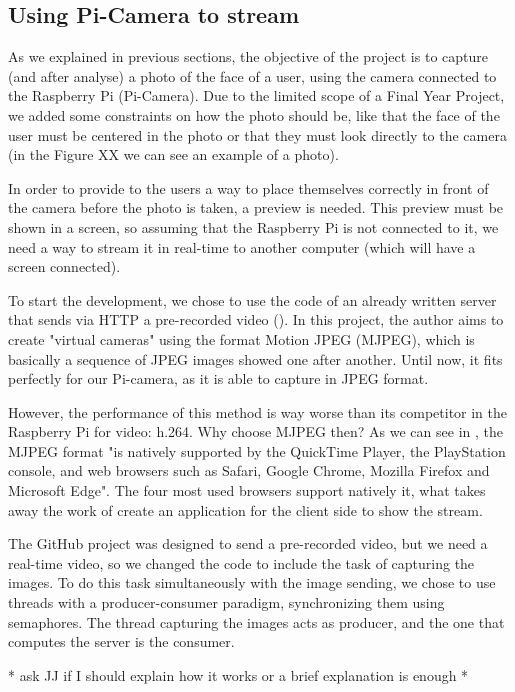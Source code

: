 	\subsection{Using Pi-Camera to stream}
	As we explained in previous sections, the objective of the project is to capture (and after analyse) a photo of the face of a user, using the camera connected to the Raspberry Pi (Pi-Camera). Due to the limited scope of a Final Year Project, we added some constraints on how the photo should be, like that the face of the user must be centered in the photo or that they must look directly to the camera (in the Figure XX we can see an example of a photo). 

	In order to provide to the users a way to place themselves correctly in front of the camera before the photo is taken, a preview is needed.	This preview must be shown in a screen, so assuming that the Raspberry Pi is not connected to it, we need a way to stream it in real-time to another computer (which will have a screen connected).

	To start the development, we chose to use the code of an already written server that sends via HTTP a pre-recorded video (\cite{mjpeg_server_base_code}). In this project, the author aims to create "virtual cameras" using the format Motion JPEG (MJPEG), which is basically a sequence of JPEG images showed one after another. Until now, it fits perfectly for our Pi-camera, as it is able to capture in JPEG format.

	However, the performance of this method is way worse than its competitor in the Raspberry Pi for video: h.264. Why choose MJPEG then? As we can see in \cite{mjpeg_format_info}, the MJPEG format "is natively supported by the QuickTime Player, the PlayStation console, and web browsers such as Safari, Google Chrome, Mozilla Firefox and Microsoft Edge". The four most used browsers support natively it, what takes away the work of create an application for the client side to show the stream. 

	The GitHub project was designed to send a pre-recorded video, but we need a real-time video, so we changed the code to include the task of capturing the images. To do this task simultaneously with the image sending, we chose to use threads with a producer-consumer paradigm, synchronizing them using semaphores. The thread capturing the images acts as producer, and the one that computes the server is the consumer.    

	* ask JJ if I should explain how it works or a brief explanation is enough *

